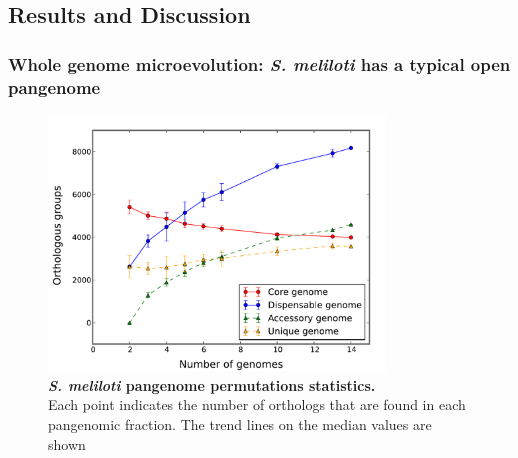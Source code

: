 \subsection{Results and Discussion}
\subsubsection{Whole genome microevolution: \textit{S. meliloti} has a typical open pangenome}

\begin{figure}[!b]
	\center
    \includegraphics[width=0.8\textwidth]{figures/4/thesis_27}
	\caption{\label{fig:pangenome}\textbf{\textit{S. meliloti} pangenome permutations statistics.}\\Each point indicates the number of orthologs that are found in each pangenomic fraction. The trend lines on the median values are shown}
\end{figure}

